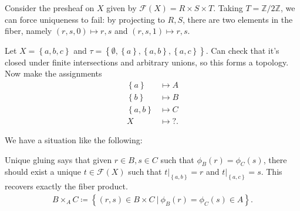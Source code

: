 \begin{example}

Consider the presheaf on \(X\) given by
\(\mathcal{F}(X) = R\times S \times T\). Taking
\(T = {\mathbb{Z}}/2{\mathbb{Z}}\), we can force uniqueness to fail: by
projecting to \(R, S\), there are two elements in the fiber, namely
\((r,s,0)\mapsto r,s\) and \((r,s,1)\mapsto r,s\).

\end{example}

\begin{example}

Let \(X = \left\{{a, b, c}\right\}\) and
\(\tau = \left\{{\emptyset, \left\{{a}\right\}, \left\{{a, b}\right\}, \left\{{a, c}\right\}}\right\}\).
Can check that it's closed under finite intersections and arbitrary
unions, so this forms a topology. Now make the assignments
\begin{align*}
\left\{{a}\right\}    & \mapsto A \\
\left\{{b}\right\}    & \mapsto B \\
\left\{{a, b}\right\} & \mapsto C \\
X         & \mapsto ?
.\end{align*}

We have a situation like the following:

\begin{center}
\end{center}

Unique gluing says that given \(r\in B, s\in C\) such that
\(\phi_B(r) = \phi_C(s)\), there should exist a unique
\(t\in \mathcal{F}(X)\) such that
\({ \left.{{t}} \right|_{{\left\{{a, b}\right\}}} } = r\) and
\({ \left.{{t}} \right|_{{\left\{{a, c}\right\}}} } = s\). This recovers
exactly the fiber product.
\begin{align*}  
B \times_A C \coloneqq\left\{{(r, s) \in B\times C {~\mathrel{\Big|}~}\phi_B(r) = \phi_C(s) \in A}\right\}
.\end{align*}

\end{example}


